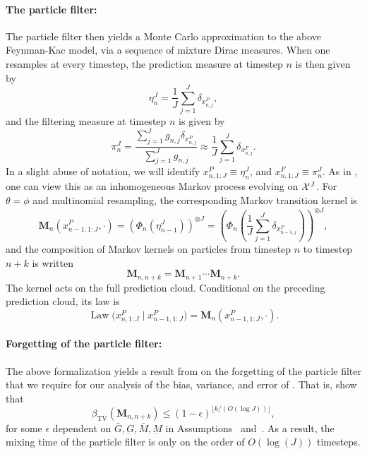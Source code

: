 \paragraph{\bf The particle filter:} The particle filter then yields a Monte Carlo approximation to the above Feynman-Kac model, via a sequence of mixture Dirac measures. When one resamples at every timestep, the prediction measure at timestep $n$ is then given by 
\begin{equation}
\eta_n^J = \frac{1}{J}\sum_{j=1}^J \delta_{x_{n,j}^P},
\end{equation}
and the filtering measure at timestep $n$ is given by
\begin{equation}
\pi_n^J = \frac{\sum_{j=1}^J g_{n,j} \delta_{x_{n,j}^P}}{\sum_{j=1}^J g_{n,j}} \approx \frac{1}{J} \sum_{j=1}^J \delta_{x_{n,j}^F}.
\end{equation}
In a slight abuse of notation, we will identify $x_{n, 1:J}^P \equiv \eta_n^J$, and $x_{n, 1:J}^F \equiv \pi_n^J$. 
As in \cite{karjalainen23}, one can view this as an inhomogeneous Markov process evolving on ${\mathcal{X}}^{J}$. For $\theta=\phi$ and multinomial resampling, the corresponding
Markov transition kernel is
\begin{equation}
\textbf{M}_n(x_{n-1, 1:J}^P, \cdot) = \left(\Phi_{n}\left(\eta_{n-1}^J\right)\right)^{\otimes J} = \left(\Phi_{n}\left(\frac{1}{J}\sum_{j=1}^J \delta_{x_{n-1,j}^P}\right)\right)^{\otimes J},
\end{equation}
and the composition of Markov kernels on particles from timestep $n$ to timestep $n+k$ is written 
\begin{equation}
\textbf{M}_{n, n+k} = \textbf{M}_{n+1}\cdots \textbf{M}_{n+k}.
\end{equation}
The kernel acts on the full prediction cloud. Conditional on the preceding
prediction cloud, its law is
\begin{equation}
\operatorname{Law}\big(x_{n,1:J}^P\mid x_{n-1,1:J}^P\big)
=\textbf{M}_n(x_{n-1,1:J}^P,\cdot).
\end{equation}

\paragraph{\bf Forgetting of the particle filter:} 
The above formalization yields a result from \cite{karjalainen23} on the forgetting of the particle filter that we require for our analysis of the bias, variance, and error of .  
That is, \cite{karjalainen23} show that
\begin{equation}
\beta_{\mathrm{TV}}\left(\mathbf{M}_{n, n+k}\right) \leq(1-\epsilon)^{\lfloor k /(O(\log J))\rfloor},
\end{equation}
for some $\epsilon$ dependent on $\bar{G}, \underbar{G}, \bar{M}, \underbar{M}$ in Assumptions~{} and~{}. As a result, the mixing time of the particle filter is only on the order of $O(\log(J))$ timesteps. 


